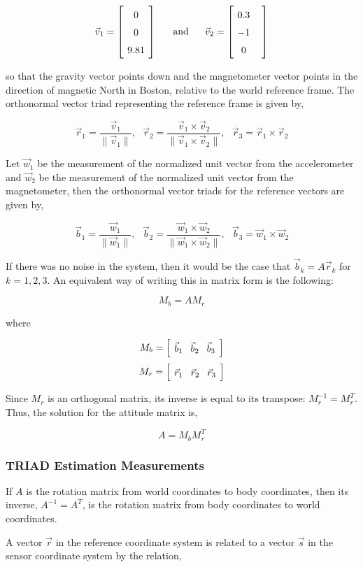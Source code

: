 \documentclass{article}
\newcommand{\mat}[2][ccccccccccccccccccccccccccccccccccccccccccccc]{\left[
        \arraycolsep=4pt\def\arraystretch{1.5}
        \begin{array}{#1} #2 \\ 
        \end{array} 
        \right]}
\newcommand{\tab}{ \textrm{ \ \ \ \ } }
\begin{document}
\begin{flushleft}
$$ \vec{v}_1 = \mat{ 0 \\ 0 \\ 9.81 } \tab \textrm{and} \tab \vec{v}_2 = \mat{ 0.3 & \\ -1 & \\ 0 } $$ 

so that the gravity vector points down and the magnetometer vector points in the direction of magnetic North in Boston, relative to the world reference frame. The orthonormal vector triad representing the reference frame is given by, 

$$ \vec{r}_1 = \frac{\vec{v}_1}{\| \vec{v}_1 \|}, \tab \vec{r}_2 = \frac{\vec{v}_1 \times \vec{v}_2}{\| \vec{v}_1 \times \vec{v}_2 \|}, \tab \vec{r}_3 = \vec{r}_1 \times \vec{r}_2 $$

Let $\vec{w}_1$ be the measurement of the normalized unit vector from the accelerometer and $\vec{w}_2$ be the measurement of the normalized unit vector from the magnetometer, then the orthonormal vector triads for the reference vectors are given by, 

$$ \vec{b}_1 = \frac{\vec{w}_1}{\| \vec{w}_1 \|}, \tab \vec{b}_2 = \frac{\vec{w}_1 \times \vec{w}_2}{\| \vec{w}_1 \times \vec{w}_2 \|}, \tab \vec{b}_3 = \vec{w}_1 \times \vec{w}_2 $$

If there was no noise in the system, then it would be the case that $\vec{b}_k = A \vec{r}_k$ for $k=1,2,3$. An equivalent way of writing this in matrix form is the following: 

$$ M_b = A M_r $$ 

where 

$$ M_b = \mat{ \vec{b}_1 & \vec{b}_2 & \vec{b}_3 } $$
$$ M_r = \mat{ \vec{r}_1 & \vec{r}_2 & \vec{r}_3 } $$

Since $M_r$ is an orthogonal matrix, its inverse is equal to its transpose: $M_r^{-1} = M_r^{T}$. Thus, the solution for the attitude matrix is, 

$$ A = M_b M_r^{T} $$

\subsubsection{TRIAD Estimation Measurements}

If $A$ is the rotation matrix from world coordinates to body coordinates, then its inverse, $A^{-1} = A^{T}$, is the rotation matrix from body coordinates to world coordinates.

\medskip

A vector $\vec{r}$ in the reference coordinate system is related to a vector $\vec{s}$ in the sensor coordinate system by the relation, 


\end{flushleft}
\end{document}
